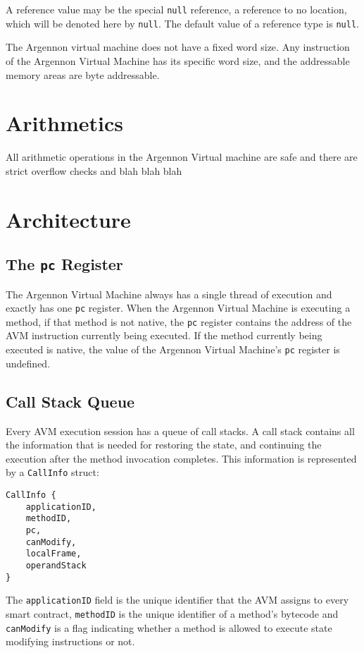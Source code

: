 \documentclass[11pt, a4paper]{report}
\begin{document}
    A reference value may be the special \texttt{null} reference, a reference to no location, which will be denoted here
    by \texttt{null}. The default value of a reference type is \texttt{null}.

    The Argennon virtual machine does not have a fixed word size. Any instruction of the Argennon Virtual Machine has
    its specific word size, and the addressable memory areas are byte addressable.


    \section{Arithmetics}\label{sec:arithmetics}

    All arithmetic operations in the Argennon Virtual machine are safe and there are strict overflow checks and
    blah blah blah


    \section{Architecture}\label{sec:arch}


    \subsection{The \texttt{pc} Register}\label{subsec:the-pc-register}

    The Argennon Virtual Machine always has a single thread of execution and exactly has one \texttt{pc} register.
    When the Argennon Virtual Machine is executing a method, if that method is not native, the \texttt{pc} register
    contains the address of the AVM instruction currently being executed. If the method currently being executed
    is native, the value of the Argennon Virtual Machine's \texttt{pc} register is undefined.

    \subsection{Call Stack Queue}\label{subsec:call-stack}

    Every AVM execution session has a queue of call stacks. A call stack contains all the information that is needed for
    restoring the state, and continuing the execution after the method invocation completes.
    This information is represented by a \texttt{CallInfo} struct:
    \begin{verbatim}
CallInfo {
    applicationID,
    methodID,
    pc,
    canModify,
    localFrame,
    operandStack
}
    \end{verbatim}
    The \texttt{applicationID} field is the unique identifier that the AVM assigns to every smart contract,
    \texttt{methodID} is the unique identifier of a method's bytecode and \texttt{canModify} is a flag
    indicating whether a method is allowed to execute state modifying instructions or not.
\end{document}
